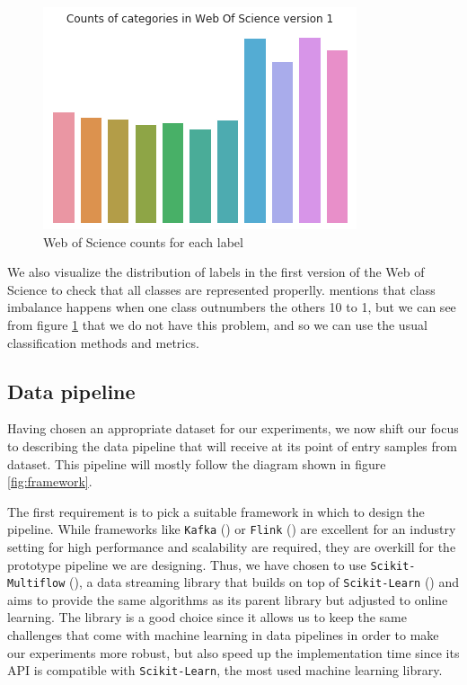 \documentclass[12pt]{extreport}
\begin{document}
\begin{figure}[ht!]
\centering
\includegraphics[width=0.8\linewidth]{assets/framework/wos_counts_1.png}
\caption{Web of Science counts for each label}
\label{fig:wos-1}
\end{figure}

We also visualize the distribution of labels in the first version of the Web of Science to check that all classes are represented properlly. \cite{classimbalance} mentions that class imbalance happens when one class outnumbers the others 10 to 1, but we can see from figure \ref{fig:wos-1} that we do not have this problem, and so we can use the usual classification methods and metrics.

\subsection{Data pipeline}

Having chosen an appropriate dataset for our experiments, we now shift our focus to describing the data pipeline that will receive at its point of entry samples from dataset. This pipeline will mostly follow the diagram shown in figure \ref{fig:framework}.

The first requirement is to pick a suitable framework in which to design the pipeline. While frameworks like \texttt{Kafka} (\cite{kafka}) or \texttt{Flink} (\cite{flink}) are excellent for an industry setting for high performance and scalability are required, they are overkill for the prototype pipeline we are designing. Thus, we have chosen to use \texttt{Scikit-Multiflow} (\cite{skmultiflow}), a data streaming library that builds on top of \texttt{Scikit-Learn} (\cite{sklearn}) and aims to provide the same algorithms as its parent library but adjusted to online learning. The library is a good choice since it allows us to keep the same challenges that come with machine learning in data pipelines in order to make our experiments more robust, but also speed up the implementation time since its API is compatible with \texttt{Scikit-Learn}, the most used machine learning library.
\end{document}
